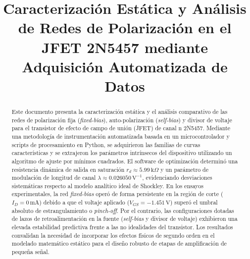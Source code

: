 \documentclass[conference]{IEEEtran}
\begin{document}
\title{Caracterización Estática y Análisis de Redes de Polarización en el JFET 2N5457 mediante Adquisición Automatizada de Datos}

\author{
}

\IEEEaftertitletext{\vspace{-1\baselineskip}}
\maketitle

\begin{abstract}
    Este documento presenta la caracterización estática y el análisis comparativo de las redes de polarización fija (\textit{fixed-bias}), auto-polarización (\textit{self-bias}) y divisor de voltaje para el transistor de efecto de campo de unión (JFET) de canal n 2N5457. Mediante una metodología de instrumentación automatizada basada en un microcontrolador y scripts de procesamiento en Python, se adquirieron las familias de curvas características y se extrajeron los parámetros intrínsecos del dispositivo utilizando un algoritmo de ajuste por mínimos cuadrados. El software de optimización determinó una resistencia dinámica de salida en saturación $r_d \approx 5.99\,\text{k}\Omega$ y un parámetro de modulación de longitud de canal $\lambda \approx 0.026050\,\text{V}^{-1}$, evidenciando desviaciones sistemáticas respecto al modelo analítico ideal de Shockley. En los ensayos experimentales, la red \textit{fixed-bias} operó de forma persistente en la región de corte ($I_D = 0\,\text{mA}$) debido a que el voltaje aplicado ($V_{GS} = -1.451\,\text{V}$) superó el umbral absoluto de estrangulamiento o \textit{pinch-off}. Por el contrario, las configuraciones dotadas de lazos de retroalimentación en la fuente (\textit{self-bias} y divisor de voltaje) exhibieron una elevada estabilidad predictiva frente a las no idealidades del transistor. Los resultados convalidan la necesidad de incorporar los efectos físicos de segundo orden en el modelado matemático estático para el diseño robusto de etapas de amplificación de pequeña señal.
\end{abstract}
\end{document}
